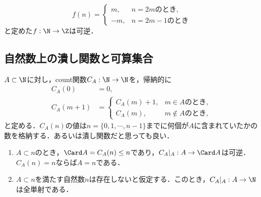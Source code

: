 \documentclass[uplatex,dvipdfmx]{jsreport}
\begin{document}
\begin{example}[$\Z$は可算無限集合]
    \[f(n)=\begin{cases}
        m,&n=2mのとき,\\
        -m,&n=2m-1のとき
    \end{cases}\]
    と定めた$f:\N\to\Z$は可逆．
\end{example}

\subsection{自然数上の潰し関数と可算集合}

\begin{proposition}
    $A\subset\N$に対し，count関数$C_A:\N\to\N$を，帰納的に
    \begin{align*}
        C_A(0)&=0,\\
        C_A(m+1)&=\begin{cases}
            C_A(m)+1,&m\in Aのとき,\\
            C_A(m),&m\notin Aのとき,
        \end{cases}
    \end{align*}
    と定める．$C_A(n)$の値は$n=\{0,1,\cdots,n-1\}$までに何個が$A$に含まれていたかの数を格納する．あるいは潰し関数だと思っても良い．
    \begin{enumerate}
        \item $A\subset n$のとき，$\Card A=C_A(n)\le n$であり，$C_A|_A:A\to\Card A$は可逆．$C_A(n)=n$ならば$A=n$である．
        \item $A\subset n$を満たす自然数$n$は存在しないと仮定する．このとき，$C_A|_A:A\to\N$は全単射である．
    \end{enumerate}
\end{proposition}
\end{document}
